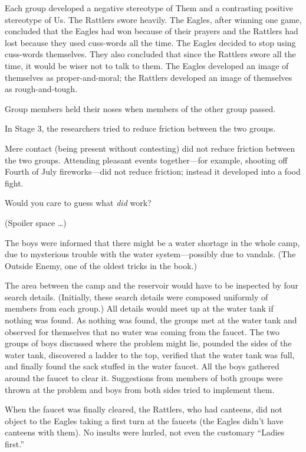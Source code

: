 {
 Each group developed a negative stereotype of Them and a
contrasting positive stereotype of Us. The Rattlers swore heavily. The
Eagles, after winning one game, concluded that the Eagles had won
because of their prayers and the Rattlers had lost because they used
cuss-words all the time. The Eagles decided to stop using cuss-words
themselves. They also concluded that since the Rattlers swore all the
time, it would be wiser not to talk to them. The Eagles developed an
image of themselves as proper-and-moral; the Rattlers developed an
image of themselves as rough-and-tough.}

{
 Group members held their noses when members of the other group
passed.}

{
 In Stage 3, the researchers tried to reduce friction between the
two groups.}

{
 Mere contact (being present without contesting) did not reduce
friction between the two groups. Attending pleasant events
together---for example, shooting off Fourth of July fireworks---did not
reduce friction; instead it developed into a food fight.}

{
 Would you care to guess what \textit{did} work?}

{
 (Spoiler space \ldots)}

{
 The boys were informed that there might be a water shortage in the
whole camp, due to mysterious trouble with the water system---possibly
due to vandals. (The Outside Enemy, one of the oldest tricks in the
book.)}

{
 The area between the camp and the reservoir would have to be
inspected by four search details. (Initially, these search details were
composed uniformly of members from each group.) All details would meet
up at the water tank if nothing was found. As nothing was found, the
groups met at the water tank and observed for themselves that no water
was coming from the faucet. The two groups of boys discussed where the
problem might lie, pounded the sides of the water tank, discovered a
ladder to the top, verified that the water tank was full, and finally
found the sack stuffed in the water faucet. All the boys gathered
around the faucet to clear it. Suggestions from members of both groups
were thrown at the problem and boys from both sides tried to implement
them.}

{
 When the faucet was finally cleared, the Rattlers, who had
canteens, did not object to the Eagles taking a first turn at the
faucets (the Eagles didn't have canteens with them). No
insults were hurled, not even the customary ``Ladies
first.''}

